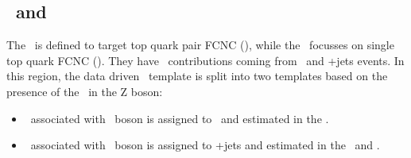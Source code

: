 \subsection{\TTSR\ and \STSR}
The \TTSR\ is defined to target top quark pair FCNC (\tZq), while the \STSR\ focusses on single top quark FCNC (\tZ). They have \NPL\ contributions coming from \DY\ and \ttbar+jets events. In this region, the data driven \NPL\ template is split into two templates based on the presence of the \NPL\ in the Z boson: 
\begin{itemize}
	\item \NPL\ associated with \PW\ boson is assigned to \DY\ and estimated in the \WZCR.
	\item\NPL\ associated with \PZ\ boson is assigned to \ttbar+jets and estimated in the \TTCR\ and \STCR.
\end{itemize}

